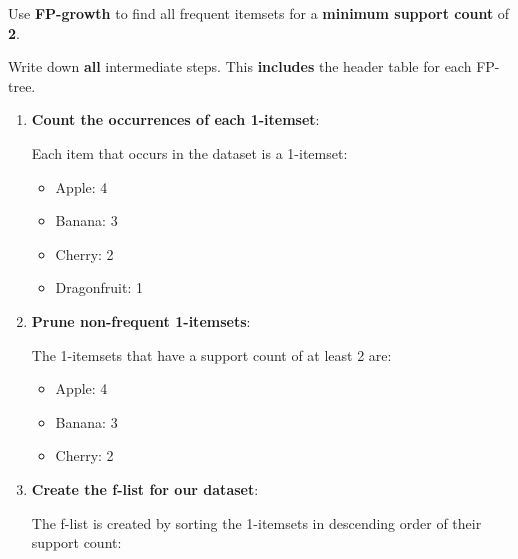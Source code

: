 \documentclass[
english,
smallborders
]{i6prcsht}
\begin{document}
Use \textbf{FP-growth} to find all frequent itemsets for a \textbf{minimum support count} of \textbf{2}.

Write down \textbf{all} intermediate steps. This \textbf{includes} the header table for each FP-tree.

\begin{solution}	
	\newcommand{\fptreerootnode}{
		\begin{tikzpicture}	
			\node[draw, fill=white, minimum height = 0.65cm, minimum width=2.25cm] at (0,-1) (Label) {$\{\}$};
		\end{tikzpicture}
	}
	
	\newcommand{\fptreenodewithoccurences}[2]{
		\begin{tikzpicture}	
			\node[draw, fill=white, minimum height = 0.65cm, minimum width=1.75cm] at (0,-1) (Label) {$#1$};
			\node[draw, fill=white, minimum height = 0.65cm, minimum width=0.5cm, right = 0cm of Label] {$#2$};
		\end{tikzpicture}
	}
	
	\begin{enumerate}	
		\item \textbf{Count the occurrences of each 1-itemset}:
		      
		      Each item that occurs in the dataset is a 1-itemset:
		      
		      \begin{itemize}	
			      \item Apple: 4
			      \item Banana: 3
			      \item Cherry: 2
			      \item Dragonfruit: 1
		      \end{itemize}
		      
		\item \textbf{Prune non-frequent 1-itemsets}:
		      
		      The 1-itemsets that have a support count of at least 2 are:
		      
		      \begin{itemize}	
			      \item Apple: 4
			      \item Banana: 3
			      \item Cherry: 2
		      \end{itemize}
		      
		\item \textbf{Create the f-list for our dataset}:
		      
		      The f-list is created by sorting the 1-itemsets in descending order of their support count:
		      

\end{enumerate}
\end{solution}
\end{document}
